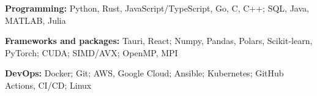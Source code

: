 \begin{enumerate}[label={[\arabic*]},nosep]
  \item \textbf{Programming:} Python, Rust, JavaScript/TypeScript, Go, C, C++; SQL, Java, MATLAB, Julia
  \item \textbf{Frameworks and packages:} Tauri, React; Numpy, Pandas, Polars, Scikit-learn, PyTorch; CUDA; SIMD/AVX; OpenMP, MPI
  \item \textbf{DevOps:} Docker; Git; AWS, Google Cloud; Ansible; Kubernetes; GitHub Actions, CI/CD; Linux
\end{enumerate}
